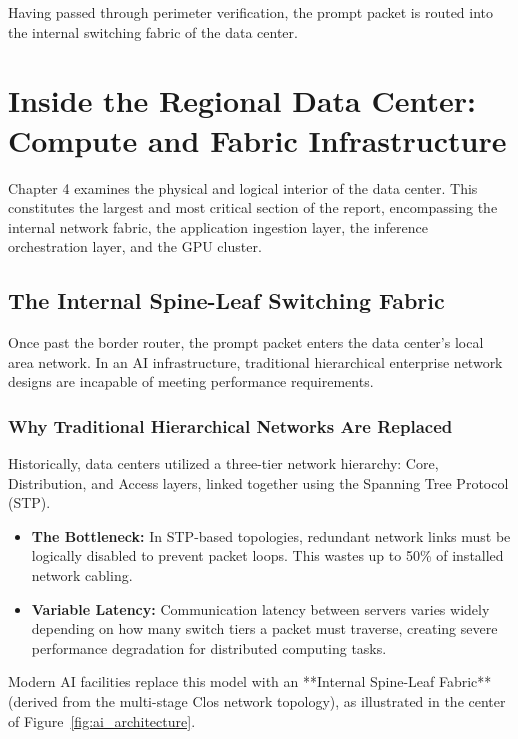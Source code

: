 \documentclass[12pt,a4paper]{report}
\begin{document}
Having passed through perimeter verification, the prompt packet is routed into the internal switching fabric of the data center.

\chapter{Inside the Regional Data Center: Compute and Fabric Infrastructure}

Chapter 4 examines the physical and logical interior of the data center. This constitutes the largest and most critical section of the report, encompassing the internal network fabric, the application ingestion layer, the inference orchestration layer, and the GPU cluster.

\section{The Internal Spine-Leaf Switching Fabric}
Once past the border router, the prompt packet enters the data center's local area network. In an AI infrastructure, traditional hierarchical enterprise network designs are incapable of meeting performance requirements.

\subsection{Why Traditional Hierarchical Networks Are Replaced}
Historically, data centers utilized a three-tier network hierarchy: Core, Distribution, and Access layers, linked together using the Spanning Tree Protocol (STP). 
\begin{itemize}[leftmargin=1.2cm]
    \item \textbf{The Bottleneck:} In STP-based topologies, redundant network links must be logically disabled to prevent packet loops. This wastes up to 50\% of installed network cabling.
    \item \textbf{Variable Latency:} Communication latency between servers varies widely depending on how many switch tiers a packet must traverse, creating severe performance degradation for distributed computing tasks.
\end{itemize}

Modern AI facilities replace this model with an **Internal Spine-Leaf Fabric** (derived from the multi-stage Clos network topology), as illustrated in the center of Figure~\ref{fig:ai_architecture}.
\end{document}

